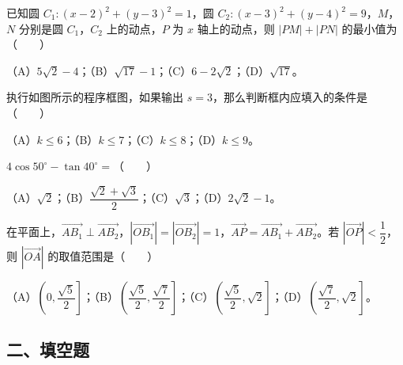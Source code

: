 \begin{question}
已知圆 $C_1:(x-2)^2+(y-3)^2=1$，圆 $C_2:(x-3)^2+(y-4)^2=9$，$M$，$N$ 分别是圆 $C_1$，$C_2$ 上的动点，$P$ 为 $x$ 轴上的动点，则 $|PM|+|PN|$ 的最小值为\mbox{（　　）}

（A）$5\sqrt2-4$；（B）$\sqrt{17}-1$；（C）$6-2\sqrt2$；（D）$\sqrt{17}$。

\Needspace{0.4\textheight}
\end{question}
\begin{question}
执行如图所示的程序框图，如果输出 $s=3$，那么判断框内应填入的条件是\mbox{（　　）}
\nopagebreak[4]
\begin{center}\end{center}
\nopagebreak[4]
（A）$k\leqslant6$；（B）$k\leqslant7$；（C）$k\leqslant8$；（D）$k\leqslant9$。

\end{question}
\begin{question}
$4\cos50^\circ-\tan40^\circ=$\mbox{（　　）}

（A）$\sqrt2$；（B）$\dfrac{\sqrt2+\sqrt3}2$；（C）$\sqrt3$；（D）$2\sqrt2-1$。

\end{question}
\begin{question}
在平面上，$\overrightarrow{AB_1}\perp\overrightarrow{AB_2}$，$|\overrightarrow{OB_1}|=|\overrightarrow{OB_2}|=1$，$\overrightarrow{AP}=\overrightarrow{AB_1}+\overrightarrow{AB_2}$。若 $|\overrightarrow{OP}|<\dfrac12$，则 $|\overrightarrow{OA}|$ 的取值范围是\mbox{（　　）}

（A）$\left(0,\dfrac{\sqrt5}2\right]$；（B）$\left(\dfrac{\sqrt5}2,\dfrac{\sqrt7}2\right]$；（C）$\left(\dfrac{\sqrt5}2,\sqrt2\right]$；（D）$\left(\dfrac{\sqrt7}2,\sqrt2\right]$。

\end{question}
\begingroup
\renewcommand{\gkpart}[1]{\Needspace{0.2\textheight}\subsection*{#1}\nopagebreak}
\gkpart{二、填空题}
\endgroup

